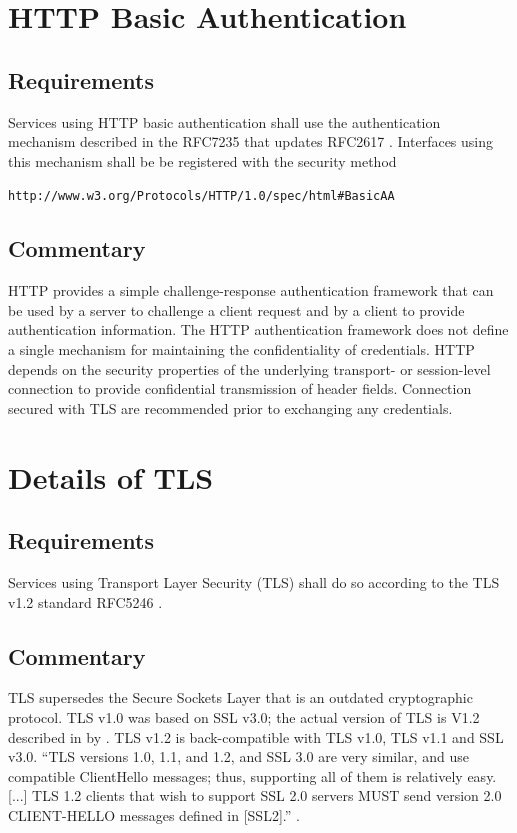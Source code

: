 \documentclass[11pt,a4paper]{ivoa}
\begin{document}
\section{HTTP Basic Authentication}
\subsection{Requirements}
Services using HTTP basic authentication shall use the authentication mechanism described in the RFC7235 \citep{std:RFC7235}
that updates RFC2617  \citep{std:RFC2617}. 
Interfaces using this mechanism shall be be registered with the security method 

 \texttt{http://www.w3.org/Protocols/HTTP/1.0/spec/html\#BasicAA}

\subsection{Commentary}
HTTP provides a simple challenge-response authentication framework that can be used by a server to challenge 
a client request and by a   client to provide authentication information.
The HTTP authentication framework does not define a single mechanism for maintaining the confidentiality of credentials. 
HTTP depends on the security properties of the underlying transport-   or session-level connection to provide 
confidential transmission of   header fields. Connection secured with TLS are recommended prior to exchanging any credentials.

\section{Details of TLS}
\subsection{Requirements}
Services using Transport Layer Security (TLS) shall do so according to the TLS v1.2 standard RFC5246 \citep{std:RFC5246}.

\subsection{Commentary}
TLS supersedes the Secure Sockets Layer that is an outdated cryptographic protocol.   
TLS v1.0 was based on SSL v3.0; the actual version of TLS is V1.2 described in by \citet{std:RFC5246}.  
TLS v1.2 is back-compatible with TLS v1.0, TLS v1.1 and SSL v3.0. 
``TLS versions 1.0, 1.1, and 1.2, and SSL 3.0 are very similar, and use compatible ClientHello messages; 
thus, supporting all of them is   relatively easy.[...] TLS 1.2 clients that wish to support SSL 2.0 servers MUST 
send  version 2.0 CLIENT-HELLO messages defined in [SSL2].'' \citep{std:RFC5246}.
\end{document}

